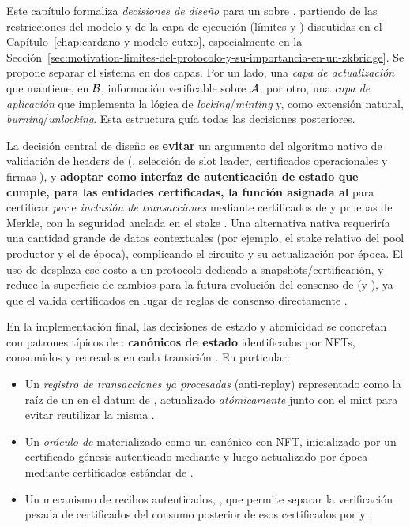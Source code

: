 
Este capítulo formaliza \emph{decisiones de diseño} para un \zkBridge sobre \Cardano, partiendo de las restricciones del modelo \eUTxO y de la capa de ejecución (límites \maxTxSize y \maxTxExUnits) discutidas en el Capítulo~\ref{chap:cardano-y-modelo-eutxo}, especialmente en la Sección~\ref{sec:motivation-limites-del-protocolo-y-su-importancia-en-un-zkbridge}. Se propone separar el sistema en dos capas. Por un lado, una \emph{capa de actualización} que mantiene, en $\mathcal{B}$, información verificable sobre $\mathcal{A}$; por otro, una \emph{capa de aplicación} que implementa la lógica de \textit{locking}/\textit{minting} y, como extensión natural, \textit{burning}/\textit{unlocking}. Esta estructura guía todas las decisiones posteriores.

La decisión central de diseño es \textbf{evitar} un argumento \ZK del algoritmo nativo de validación de headers de \Praos (\VRF, selección de slot leader, certificados operacionales y firmas \KES), y \textbf{adoptar \Mithril como interfaz de autenticación de estado que cumple, para las entidades certificadas, la función asignada al \LightClient} para certificar \emph{\StakeDistribution por \Epoch} e \emph{inclusión de transacciones} mediante certificados de \Mithril y pruebas de Merkle, con la seguridad anclada en el stake \cite{MithrilDocsOverview}. Una alternativa nativa requeriría una cantidad grande de datos contextuales (por ejemplo, el stake relativo del pool productor y el \Nonce de época), complicando el circuito y su actualización por época. El uso de \Mithril desplaza ese costo a un protocolo dedicado a snapshots/certificación, y reduce la superficie de cambios para la futura evolución del consenso de \Cardano (\Peras y \Leios), ya que el \Bridge valida certificados \Mithril en lugar de reglas de consenso directamente \cite{PerasFAQ,LeiosSite}.

En la implementación final, las decisiones de estado y atomicidad se concretan con patrones típicos de \eUTxO: \textbf{\UTxOs canónicos de estado} identificados por NFTs, consumidos y recreados en cada transición \cite{Chakravarty2020}. En particular:

\begin{itemize}[noitemsep]
	\item Un \emph{registro de transacciones ya procesadas} (anti-replay) representado como la raíz de un \SMT en el datum de \TxsUpdaterUTxO, actualizado \emph{atómicamente} junto con el mint para evitar reutilizar la misma \LockTx.
	\item Un \emph{oráculo de \StakeDistribution} materializado como un \UTxO canónico con NFT, inicializado por un certificado génesis autenticado mediante \GenesisVerificationKey y luego actualizado por época mediante certificados estándar de \Mithril \cite{MithrilDocsCertChain}.
	\item Un mecanismo de recibos autenticados, \ProofReceipt, que permite separar la verificación pesada de certificados \Mithril del consumo posterior de esos certificados por \StakeDistTx y \MintTx.
\end{itemize}

